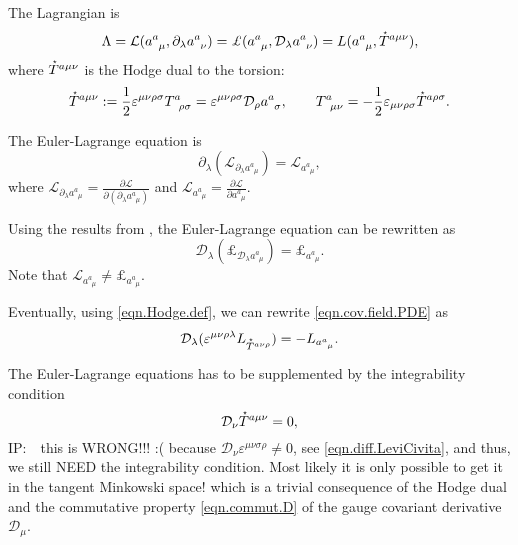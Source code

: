 \documentclass[
10pt, %
a4paper, %
oneside, %
headinclude,footinclude, %
BCOR5mm, %
]{scrartcl}
\newcommand{\IP}[1]{{\color{Red}IP:\ \ #1}}
\newcommand{\pd}{\partial}
\newcommand{\tetr}[2]{a^{#1}_{\phantom{#1}#2}}
\newcommand{\D}[1]{\mathcal{D}_{#1}} %
\newcommand{\Tors}[2]{T^{#1}_{\phantom{a}#2}}
\newcommand{\Lag}{\mathcal{L}}	%
\newcommand{\Lagcov}{\pounds}%
\newcommand{\Laghodge}{L}%
\newcommand{\veps}{\varepsilon}
\newcommand{\HT}[1]{\accentset{\star}{T}^{#1}}
\begin{document}
The Lagrangian is 
\begin{equation}
\Lambda = \Lag(\tetr{a}{\mu},\pd_\lambda\tetr{a}{\nu}) = 
\Lagcov(\tetr{a}{\mu},\D{\lambda}\tetr{a}{\nu})  = \Laghodge(\tetr{a}{\mu},\HT{a\mu\nu}),
\end{equation}
where $ \HT{a\mu\nu} $ is the Hodge dual to the torsion:
\begin{equation}\label{eqn.Hodge.def}
\HT{a\mu\nu} := \frac{1}{2}\veps^{\mu\nu\rho\sigma}\Tors{a}{\rho\sigma} = 
\veps^{\mu\nu\rho\sigma}\D{\rho}\tetr{a}{\sigma}, \qquad \Tors{a}{\mu\nu} = 
-\frac{1}{2}\veps_{\mu\nu\rho\sigma}\HT{a\rho\sigma}.
\end{equation}




The Euler-Lagrange equation is
\begin{equation}
\pd_\lambda(\Lag_{\pd_\lambda\tetr{a}{\mu}}) = \Lag_{\tetr{a}{\mu}},
\end{equation}
where $ \Lag_{\pd_\lambda\tetr{a}{\mu}} = \frac{\pd \Lag}{\pd(\pd_\lambda\tetr{a}{\mu})} $ and $ 
\Lag_{\tetr{a}{\mu}} = \frac{\pd \Lag}{\pd \tetr{a}{\mu}} $.


Using the results from \cite{Lewis2009,Lorce2013}, the Euler-Lagrange equation can be rewritten as
\begin{equation}\label{eqn.cov.field.PDE}
\D{\lambda}(\Lagcov_{\D{\lambda}\tetr{a}{\mu}}) = \Lagcov_{\tetr{a}{\mu}}.
\end{equation}
Note that $  \Lag_{\tetr{a}{\mu}} \neq  \Lagcov_{\tetr{a}{\mu}}. $

Eventually, using \eqref{eqn.Hodge.def}, we can rewrite \eqref{eqn.cov.field.PDE} as
\begin{equation}\label{eqn.cov.field.PDE.Hodge}
\D{\lambda}(\veps^{\mu\nu\rho\lambda}\Laghodge_{\HT{a\nu\rho}}) =-\Laghodge_{\tetr{a}{\mu}}.
\end{equation}

The Euler-Lagrange equations has to be supplemented by the integrability condition
\begin{equation}
\D{\nu}\HT{a\mu\nu} = 0,
\end{equation}
\IP{this is WRONG!!! :( because $ \D{\nu}\veps^{\mu\nu\sigma\rho} \neq 0 $, see 
\eqref{eqn.diff.LeviCivita}, and thus, we still NEED the integrability condition. Most likely it is 
only possible to get it in the tangent Minkowski space!}
which is a trivial consequence of the Hodge dual and the commutative property \eqref{eqn.commut.D} 
of the gauge 
covariant derivative $ \D{\mu} $.
\end{document}

